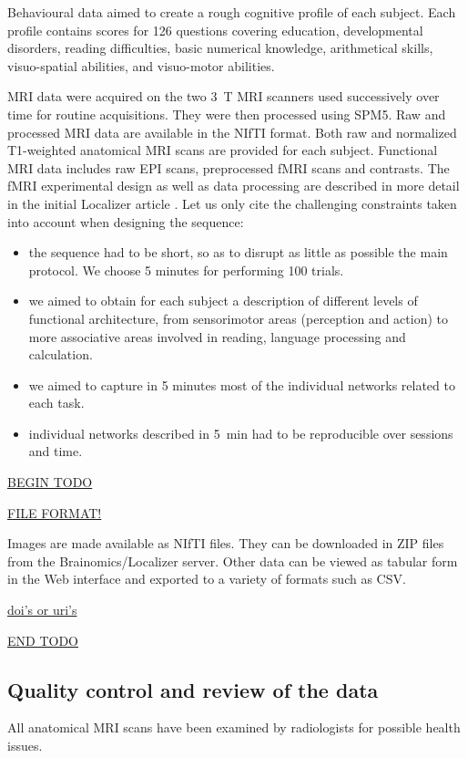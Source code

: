 \documentclass[review]{elsarticle}
\begin{document}
Behavioural data aimed to create a rough cognitive profile of each subject. Each profile contains scores for 126 questions covering education, developmental disorders, reading difficulties, basic numerical knowledge, arithmetical skills, visuo-spatial abilities, and visuo-motor abilities.

MRI data were acquired on the two 3~T MRI scanners used successively over time for routine acquisitions. They were then processed using SPM5. Raw and processed MRI data are available in the NIfTI format. Both raw and normalized T1-weighted anatomical MRI scans are provided for each subject. Functional MRI data includes raw EPI scans, preprocessed fMRI scans and contrasts. The fMRI experimental design as well as data processing are described in more detail in the initial Localizer article \cite{Pinel2007}. Let us only cite the challenging constraints taken
into account when designing the sequence:
\begin{itemize}
\item the sequence had to be short, so as to disrupt as little as possible the main protocol. We choose 5 minutes for performing 100 trials.
\item we aimed to obtain for each subject a description of different levels of functional architecture, from sensorimotor areas (perception and action) to more associative areas involved in reading, language processing and calculation.
\item we aimed to capture in 5 minutes most of the individual networks related to each task.
\item individual networks described in 5~min had to be reproducible over sessions and time.
\end{itemize}

\underline{BEGIN TODO}

\underline{FILE FORMAT!}

Images are made available as NIfTI files. They can be downloaded in ZIP files from the Brainomics/Localizer server. Other data can be viewed as tabular form in the Web interface and exported to a variety of formats such as CSV.

\underline{doi's or uri's}

\underline{END TODO}


\subsection{Quality control and review of the data}

All anatomical MRI scans have been examined by radiologists for possible health issues.
\end{document}
